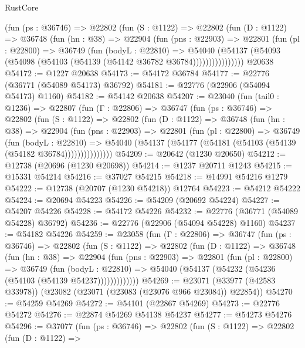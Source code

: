 \begin{lexlean}{RustCore}
\begin{coremodule}
          (fun (ps : @36746) =>
          @22802
            (fun (S : @1122) =>
            @22802
              (fun (D : @1122) =>
              @36748
                (fun (hn : @38) =>
                @22904
                  (fun (pns : @22903) =>
                  @22801
                    (fun (pl : @22800) =>
                    @36749
                      (fun (bodyL : @22810) =>
                      @54040
                        (@54137
                          (@54093 (@54098 (@54103 (@54139 (@54142 @36782 @36784))))))))))))))))
    @20638
@54172 := @1227 @20638
@54173 := @54172 @36784
@54177 := @22776 (@36771 (@54089 @54173) @36792)
@54181 := @22776 (@22906 (@54094 @54173) @1160)
@54182 := @54142 @20638
@54207 := @23040
    (fun (tail0 : @1236) =>
    @22807
      (fun (Γ : @22806) =>
      @36747
        (fun (ps : @36746) =>
        @22802
          (fun (S : @1122) =>
          @22802
            (fun (D : @1122) =>
            @36748
              (fun (hn : @38) =>
              @22904
                (fun (pns : @22903) =>
                @22801
                  (fun (pl : @22800) =>
                  @36749
                    (fun (bodyL : @22810) =>
                    @54040 (@54137 (@54177 (@54181 (@54103 (@54139 (@54182 @36784)))))))))))))))
@54209 := @20642 (@1230 @20650)
@54212 := @12738 (@20696 (@1230 @20698))
@54214 := @1237 @20711 @1243
@54215 := @15331 @54214
@54216 := @37027 @54215
@54218 := @14991 @54216 @1279
@54222 := @12738 (@20707 (@1230 @54218)) @12764
@54223 := @54212 @54222
@54224 := @20694 @54223
@54226 := @54209 (@20692 @54224)
@54227 := @54207 @54226
@54228 := @54172 @54226
@54232 := @22776 (@36771 (@54089 @54228) @36792)
@54236 := @22776 (@22906 (@54094 @54228) @1160)
@54237 := @54182 @54226
@54259 := @23058
    (fun (Γ : @22806) =>
    @36747
      (fun (ps : @36746) =>
      @22802
        (fun (S : @1122) =>
        @22802
          (fun (D : @1122) =>
          @36748
            (fun (hn : @38) =>
            @22904
              (fun (pns : @22903) =>
              @22801
                (fun (pl : @22800) =>
                @36749
                  (fun (bodyL : @22810) =>
                  @54040 (@54137 (@54232 (@54236 (@54103 (@54139 @54237)))))))))))))
@54269 := @23071 (@33977 (@42583 @33978)) (@23082 (@23071 (@23083 (@23076 @966 @23084)) @22854))
@54270 := @54259 @54269
@54272 := @54101 (@22867 @54269)
@54273 := @22776 @54272
@54276 := @22874 @54269 @54138 @54237
@54277 := @54273 @54276
@54296 := @37077
    (fun (ps : @36746) =>
    @22802
      (fun (S : @1122) =>
      @22802
        (fun (D : @1122) =>

\end{coremodule}
\end{lexlean}
